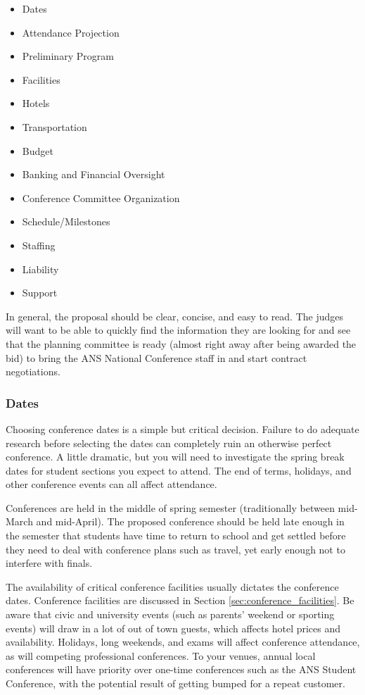 \documentclass[12pt]{article}
\begin{document}
\begin{itemize}
\item{Dates}
\item{Attendance Projection}
\item{Preliminary Program}
\item{Facilities}
\item{Hotels}
\item{Transportation}
\item{Budget}
\item{Banking and Financial Oversight}
\item{Conference Committee Organization}
\item{Schedule/Milestones}
\item{Staffing}
\item{Liability}
\item{Support}
\end{itemize}

In general, the proposal should be clear, concise, and easy to read. The judges will want to be able to quickly find the information they are looking for and see that the planning committee is ready (almost right away after being awarded the bid) to bring the ANS National Conference staff in and start contract negotiations.

\subsubsection{Dates}
Choosing conference dates is a simple but critical decision. Failure to do adequate research before selecting the dates can completely ruin an otherwise perfect conference. A little dramatic, but you will need to investigate the spring break dates for student sections you expect to attend. The end of terms, holidays, and other conference events can all affect attendance.

Conferences are held in the middle of spring semester (traditionally between mid-March and mid-April). The proposed conference should be held late enough in the semester that students have time to return to school and get settled before they need to deal with conference plans such as travel, yet early enough not to interfere with finals.

The availability of critical conference facilities usually dictates the conference dates. Conference facilities are discussed in Section \ref{sec:conference_facilities}. Be aware that civic and university events (such as parents’ weekend or sporting events) will draw in a lot of out of town guests, which affects hotel prices and availability. Holidays, long weekends, and exams will affect conference attendance, as will competing professional conferences. To your venues, annual local conferences will have priority over one-time conferences such as the ANS Student Conference, with the potential result of getting bumped for a repeat customer.
\end{document}

